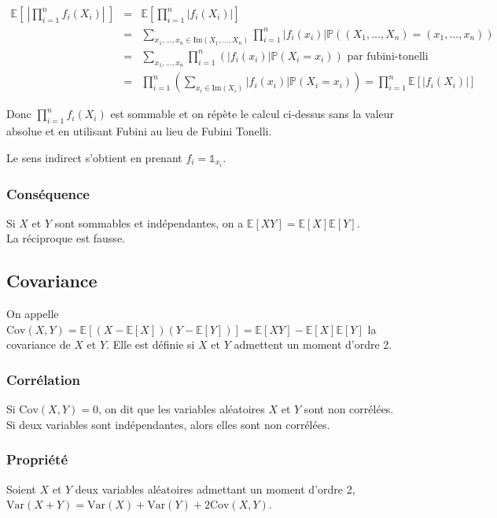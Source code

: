 \documentclass[a4paper,10pt]{book} %
\newcommand{\E}{\mathbb{E}} %
\renewcommand{\P}{\mathbb{P}} %
\newcommand\abs[1]{\left|#1\right|}
\newcommand{\Ima}{\mathrm{Im}} %
\newcommand{\indi}{\mathds{1}} %
\newcommand{\Var}{\mathrm{Var}} %
\newcommand{\Cov}{\mathrm{Cov}} %
\begin{document}
$\begin{array}{rcl}\displaystyle \E\left[~\abs{\prod_{i=1}^nf_i(X_i)}~\right]&=&\displaystyle \E\left[\prod_{i=1}^n\abs{f_i(X_i)}\right]\\
&=&\displaystyle 
\sum_{x_1,...,x_n \in \Ima(X_1,...,X_n)} \prod_{i=1}^n\abs{f_i(x_i)}\P((X_1,...,X_n)=(x_1,...,x_n))\\
&=&\displaystyle \sum_{x_1,...,x_n}\prod_{i=1}^n(\abs{f_i(x_i)}\P(X_i=x_i))\text{ par fubini-tonelli }\\
&=&\displaystyle \prod_{i=1}^n (\sum_{x_i\in \Ima(X_i)}\abs{f_i(x_i)}\P(X_i=x_i)) = \prod_{i=1}^n\E[\abs{f_i(X_i)}]\end{array}$

Donc $\displaystyle \prod_{i=1}^n f_i(X_i)$ est sommable et on répète le calcul ci-dessus sans la valeur absolue et en utilisant Fubini au lieu de Fubini Tonelli.

Le sens indirect s'obtient en prenant $f_i = \indi_{x_i}$.

\subsubsection{Conséquence}
Si $X$ et $Y$ sont sommables et indépendantes, on a $\E[XY]=\E[X]\E[Y]$.\\

La réciproque est fausse.

\subsection{Covariance}
On appelle $\Cov(X,Y)= \E[(X-\E[X])(Y-\E[Y])]=\E[XY]-\E[X]\E[Y]$ la covariance de $X$ et $Y$. Elle est définie si $X$ et $Y$ admettent un moment d'ordre 2.

\subsubsection{Corrélation}
Si $\Cov(X,Y)=0$, on dit que les variables aléatoires $X$ et $Y$ sont non corrélées.\\

Si deux variables sont indépendantes, alors elles sont non corrélées.

\subsubsection{Propriété}
Soient $X$ et $Y$ deux variables aléatoires admettant un moment d'ordre 2, $\Var(X+Y)=\Var(X)+\Var(Y)+2\Cov(X,Y)$.
\end{document}
